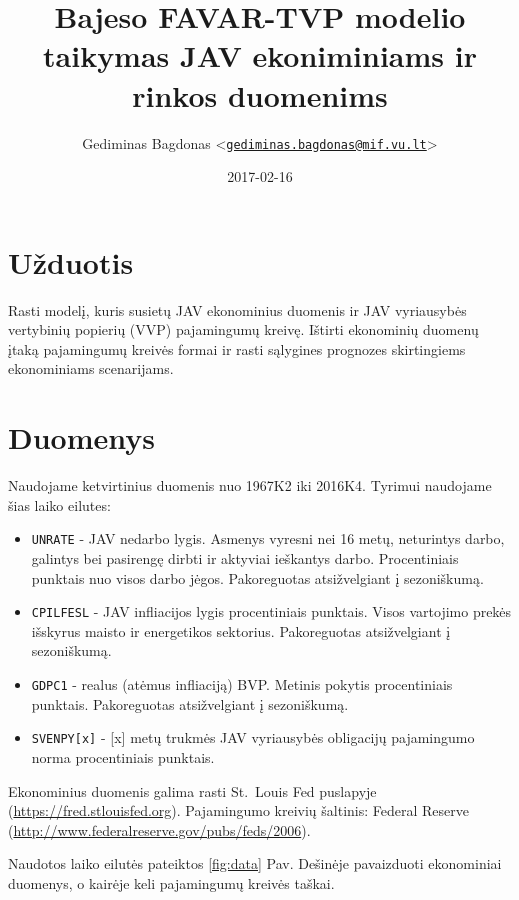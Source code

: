 \documentclass[12pt,lithuanian,]{article}
\title{Bajeso FAVAR-TVP modelio taikymas JAV ekoniminiams ir rinkos duomenims}
\author{Gediminas Bagdonas
\textless{}\href{mailto:gediminas.bagdonas@mif.vu.lt}{\nolinkurl{gediminas.bagdonas@mif.vu.lt}}\textgreater{}}
\date{2017-02-16}
\providecommand{\tightlist}{%
  \setlength{\itemsep}{0pt}\setlength{\parskip}{0pt}}
\begin{document}
\maketitle

\section{Užduotis}\label{uzduotis}

Rasti modelį, kuris susietų JAV ekonominius duomenis ir JAV vyriausybės
vertybinių popierių (VVP) pajamingumų kreivę. Ištirti ekonominių duomenų
įtaką pajamingumų kreivės formai ir rasti sąlygines prognozes
skirtingiems ekonominiams scenarijams.

\section{Duomenys}\label{duomenys}

Naudojame ketvirtinius duomenis nuo 1967K2 iki 2016K4. Tyrimui naudojame
šias laiko eilutes:

\begin{itemize}
\tightlist
\item
  \texttt{UNRATE} - JAV nedarbo lygis. Asmenys vyresni nei 16 metų,
  neturintys darbo, galintys bei pasirengę dirbti ir aktyviai ieškantys
  darbo. Procentiniais punktais nuo visos darbo jėgos. Pakoreguotas
  atsižvelgiant į sezoniškumą.
\item
  \texttt{CPILFESL} - JAV infliacijos lygis procentiniais punktais.
  Visos vartojimo prekės išskyrus maisto ir energetikos sektorius.
  Pakoreguotas atsižvelgiant į sezoniškumą.
\item
  \texttt{GDPC1} - realus (atėmus infliaciją) BVP. Metinis pokytis
  procentiniais punktais. Pakoreguotas atsižvelgiant į sezoniškumą.
\item
  \texttt{SVENPY{[}x{]}} - {[}x{]} metų trukmės JAV vyriausybės
  obligacijų pajamingumo norma procentiniais punktais.
\end{itemize}

Ekonominius duomenis galima rasti St.~Louis Fed puslapyje
(\url{https://fred.stlouisfed.org}). Pajamingumo kreivių šaltinis:
Federal Reserve (\url{http://www.federalreserve.gov/pubs/feds/2006}).

Naudotos laiko eilutės pateiktos \ref{fig:data} Pav. Dešinėje
pavaizduoti ekonominiai duomenys, o kairėje keli pajamingumų kreivės
taškai.
\end{document}
